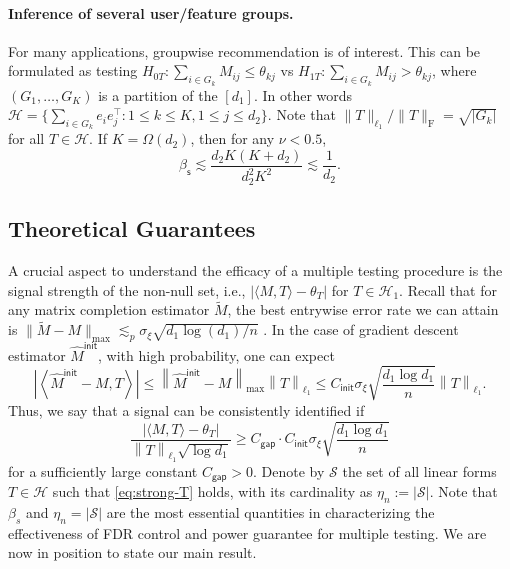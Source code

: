 \documentclass[12pt]{article}
\newcommand{\abs}[1]{\left\lvert#1\right\rvert}
\newcommand{\norm}[1]{\left\lVert#1\right\rVert}
\newcommand{\cH}{\mathcal{H}}
\newcommand{\cS}{\mathcal{S}}
\newcommand{\init}{{\mathsf{init}}}
\theoremstyle{plain}
\begin{document}
\begin{sloppypar}
	
\paragraph{Inference of several user/feature groups.} For many applications, groupwise recommendation \citep{bi2018multilayer} is of interest. This can be formulated as testing $H_{0T}: \sum_{i\in G_k} M_{ij}\le \theta_{kj}$ vs $H_{1T}: \sum_{i\in G_k} M_{ij}>\theta_{kj} $, where $(G_1,\ldots,G_K)$ is a partition of the $[d_1]$. In other words $\cH=\{\sum_{i\in G_k}e_ie_j^\top: 1\le k\le K, 1\le j\le d_2\}$.
Note that $\|T\|_{\ell_1} /\|T\|_{\mathrm{F}}=\sqrt{\abs{G_k} }$ for all $T\in \cH$. If $K=\Omega(d_2)$, then for any $\nu<0.5$,
$$\beta_{\mathsf{s} }\lesssim \frac{d_2K(K+d_2)}{d_2^2K^2}\lesssim\frac{1}{d_2}.$$

\subsection{Theoretical Guarantees}
A crucial aspect to understand the efficacy of a multiple testing procedure is the signal strength of the non-null set, i.e., $|\langle M, T\rangle-\theta_T|$ for $T\in\cH_1$. Recall that for any matrix completion estimator $\widetilde{M}$, the best entrywise error rate we can attain is $\|\widetilde{M}-M\|_{\max}\lesssim_p \sigma_{\xi}\sqrt{ d_1 \log (d_1)/n}$ \citep{koltchinskii2011nuclear}. In the case of gradient descent estimator $\widehat{M}^{\mathsf{init}}$, with high probability, one can expect
\begin{equation*}
\abs{\left\langle \widehat{M}^{\mathsf{init}}-M ,T  \right\rangle} \le \norm{\widehat{M}^{\mathsf{init}}-M}_{\max} \norm{T}_{\ell_1}\le  C_{\init}  \sigma_{\xi}\sqrt{\frac{ d_1 \log d_1}{n}} \norm{T}_{\ell_1}.
\end{equation*}
Thus, we say that a signal can be consistently identified if
\begin{equation}\label{eq:strong-T}
\frac{ \abs{\langle M, T\rangle-\theta_T } }{  \norm{T}_{\ell_1} \sqrt{ \log  d_1 } } \ge C_{\mathsf{gap}  } \cdot C_{\init} \sigma_{\xi}\sqrt{\frac{ d_1 \log d_1}{n}}
\end{equation}
for a sufficiently large constant $C_{\mathsf{gap}}>0$. Denote by $\cS$ the set of all linear forms $T\in \cH$ such that \eqref{eq:strong-T} holds, with its cardinality as $\eta_n:=\abs{\cS}$. Note that $\beta_s$ and $\eta_n=|\cS|$ are the most essential quantities in characterizing the effectiveness of FDR control and power guarantee for multiple testing. We are now in position to state our main result.


\end{sloppypar}
\end{document}
